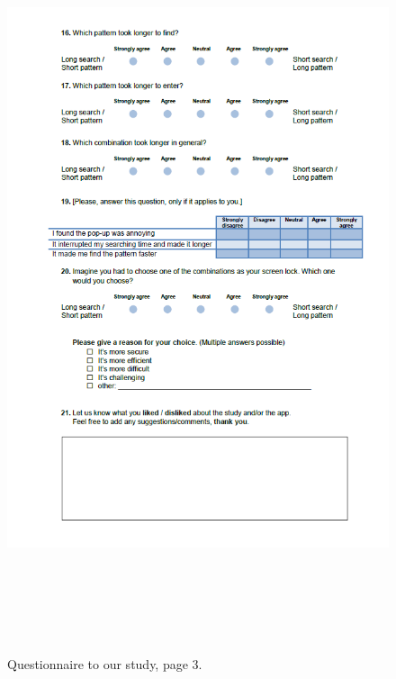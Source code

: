 \begin{figure}[H]
\includegraphics[width=15cm, height=22cm]{Chapters/graphics/survey3.PNG}
\caption{Questionnaire to our study, page 3.}
\end{figure}



